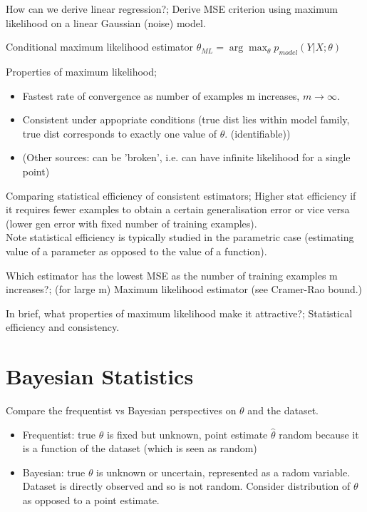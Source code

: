 \documentclass{article}
\begin{document}
How can we derive linear regression?; Derive MSE criterion using maximum likelihood on a linear Gaussian (noise) model.

Conditional maximum likelihood estimator $\theta_{ML} = \arg\max_{\theta} p_{model}(Y | X;\theta)$

Properties of maximum likelihood; \begin{itemize}
	\item Fastest rate of convergence as number of examples m increases, $m\to\infty$.
	\item Consistent under appopriate conditions (true dist lies within model family, true dist corresponds to exactly one value of $\theta$. (identifiable))
	\item (Other sources: can be 'broken', i.e. can have infinite likelihood for a single point)
\end{itemize}

Comparing statistical efficiency of consistent estimators; Higher stat efficiency if it requires fewer examples to obtain a certain generalisation error or vice versa (lower gen error with fixed number of training examples). \\ Note statistical efficiency is typically studied in the parametric case (estimating value of a parameter as opposed to the value of a function).

Which estimator has the lowest MSE as the number of training examples m increases?; (for large m) Maximum likelihood estimator (see Cramer-Rao bound.)

In brief, what properties of maximum likelihood make it attractive?; Statistical efficiency and consistency.

\section{Bayesian Statistics}

Compare the frequentist vs Bayesian perspectives on $\theta$ and the dataset. \begin{itemize}
	\item Frequentist: true $\theta$ is fixed but unknown, point estimate $\hat{\theta}$ random because it is a function of the dataset (which is seen as random)
	\item Bayesian: true $\theta$ is unknown or uncertain, represented as a radom variable. Dataset is directly observed and so is not random. Consider distribution of $\theta$ as opposed to a point estimate.
\end{itemize}
\end{document}
